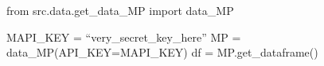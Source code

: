 from src.data.get_data_MP import data_MP

MAPI_KEY = ``very_secret_key_here''
MP = data_MP(API_KEY=MAPI_KEY)
df = MP.get_dataframe()
